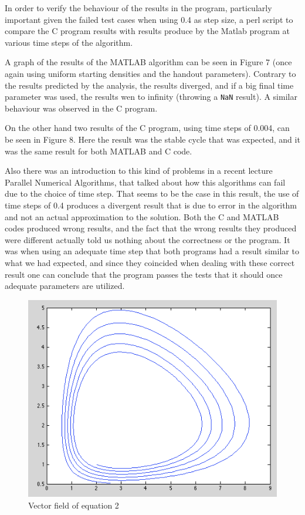 \documentclass[12pt,a4paper]{article}
\begin{document}
In order to verify the behaviour of the results in the program, particularly important given the failed test cases when using 0.4 as step size, a perl script to compare the C program results with results produce by the Matlab program at various time steps of the algorithm. 

A graph of the results of the MATLAB algorithm can be seen in Figure 7 (once again using uniform starting densities and the handout parameters). Contrary to the results predicted by the analysis, the results diverged, and if a big final time parameter was used, the results wen to infinity (throwing a \texttt{NaN} result). A similar behaviour was observed in the C program.

On the other hand two results of the C program, using time steps of 0.004, can be seen in Figure 8. Here the result was the stable cycle that was expected, and it was the same result for both MATLAB and C code.

Also there was an introduction to this kind of problems in a recent lecture Parallel Numerical Algorithms, that talked about how this algorithms can fail due to the choice of time step. That seems to be the case in this result, the use of time steps of 0.4 produces a divergent result that is due to error in the algorithm and not an actual approximation to the solution. Both the C and MATLAB codes produced wrong results, and the fact that the wrong results they produced were different actually told us nothing about the correctness or the program. It was when using an adequate time step that both programs had a result similar to what we had expected, and since they coincided when dealing with these correct result one can conclude that the program passes the tests that it should once adequate parameters are utilized.

\begin{figure}[hb]
    \centering
    \includegraphics[scale=0.5]{images/diverge.png}
    \caption{Vector field of equation 2}
\end{figure}
\end{document}
